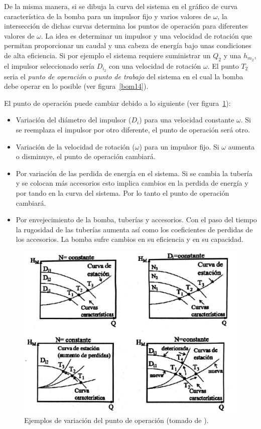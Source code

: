 \documentclass[11pt, oneside]{article}
\begin{document}
De la misma manera, si se dibuja la curva del sistema en el gr\'afico de curva caracter\'istica de la bomba para un impulsor fijo y varios valores de $\omega$, la intersecci\'on de dichas curvas determina los puntos de  operaci\'on para diferentes valores de  $\omega$. La idea es determinar un impulsor y una velocidad de rotaci\'on que permitan proporcionar un caudal y una cabeza de energ\'ia bajo unas condiciones de alta eficiencia. Si por ejemplo el sistema requiere suministrar un  $Q_2$ y una $h_{m_2}$, el impulsor seleccionado ser\'ia $D_{i_2}$ con una velocidad de rotaci\'on $\omega$. El punto $T_2$ seria el \emph{punto de operaci\'on} o \emph{punto de trabajo} del sistema en el cual la bomba debe operar en lo posible (ver figura~\ref{bom14}). 

El punto de operaci\'on puede cambiar debido a lo siguiente (ver figura~\ref{bom15}):
\begin{itemize}
\item Variaci\'on del di\'ametro del impulsor ($D_i$) para una velocidad constante $\omega$. Si se reemplaza el impulsor por otro diferente, el punto de operaci\'on ser\'a otro.
\item Variaci\'on de la velocidad de rotaci\'on ($\omega$) para un impulsor fijo. Si $\omega$ aumenta o disminuye, el punto de operaci\'on cambiar\'a. 
\item Por variaci\'on de las perdida de energ\'ia en el sistema. Si se cambia la tuber\'ia y se colocan m\'as accesorios esto implica cambios en la perdida de energ\'ia y por tando en la curva del sistema. Por lo tanto el punto de operaci\'on cambiar\'a. 
\item Por envejecimiento de la bomba, tuber\'ias y accesorios. Con el paso del tiempo la rugosidad de las tuber\'ias aumenta as\'i como los coeficientes de perdidas de los accesorios. La bomba sufre cambios en su eficiencia y en su capacidad.  
\end{itemize}

\begin{figure}[h]
\centering
\includegraphics[width=12cm]{./figs/bom15.jpeg}
\caption{Ejemplos de variaci\'on del punto de operaci\'on (tomado de \cite{agudelo2011mecanica}).} 
\label{bom15}
\end{figure}
\end{document}
